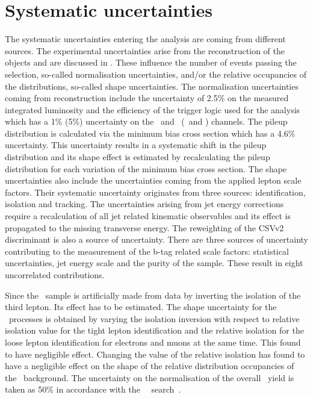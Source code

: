 \newpage
\section{Systematic uncertainties}
\label{sec:sys}
The systematic uncertainties entering the analysis are coming from different sources. The experimental uncertainties arise from the reconstruction of the objects and are discussed in . These influence the number of events passing the selection, so-called normalisation uncertainties, and/or the relative occupancies of the distributions, so-called shape
 uncertainties. The normalisation uncertainties coming from reconstruction include the uncertainty of 2.5\% on the measured integrated luminosity and the efficiency of the trigger logic used for the analysis which has a 1\% (5\%) uncertainty on the 
 \mumumu\ and \emumu\ (\eemu\ and \eee) channels. The  pileup distribution is calculated via the minimum bias cross section which has a 4.6\% uncertainty. This uncertainty results in a systematic shift in the pileup distribution and its shape effect is estimated by recalculating the pileup distribution for each variation of the minimum bias cross section. The shape uncertainties also include the uncertainties coming from the applied lepton scale factors. Their systematic uncertainty originates from three sources: identification, isolation and tracking.  The uncertainties arising from jet energy corrections require a recalculation of all jet related kinematic observables and its effect is propagated to the missing transverse energy.  The reweighting of the CSVv2 discriminant is also a source of uncertainty. There are three sources of uncertainty contributing to the measurement of the b-tag related scale factors: statistical uncertainties, jet energy scale and the purity of the sample. These result in eight uncorrelated contributions. 
 
 Since the \NPL\ sample is artificially made from data by inverting the isolation of the third lepton. Its effect has to be estimated. The shape uncertainty for the \NPL\ processes is obtained by varying the isolation inversion with respect to relative isolation value for the tight lepton identification and the relative isolation for  the loose lepton identification for electrons and muons at the same time. This found to have negligible effect. Changing the value of the relative isolation has found to have a negligible effect on the shape of the relative distribution occupancies of the \NPL\ background. The uncertainty on the normalisation of the overall \NPL\ yield is taken as 50\% in accordance with the \SM\ \tZq\ search~\cite{CMS-PAS-TOP-16-020}.
 
